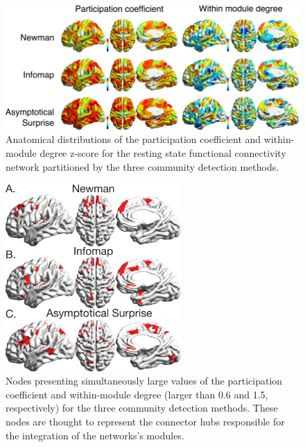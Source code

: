 \begin{figure}[!htb]
\centering
\includegraphics[width=1\textwidth]{images/pacopaperfigure8.pdf}
\caption{Anatomical distributions of the participation coefficient and within-module degree z-score for the resting state functional connectivity network partitioned by the three community detection methods.}
\label{fig:hubclassification}
\end{figure}
\begin{figure}[!htb]
\centering
\includegraphics[width=0.6\textwidth]{images/pacopaperfigure9.pdf}
\caption{Nodes presenting simultaneously large values of the participation coefficient and within-module degree (larger than 0.6 and 1.5, respectively) for the three community detection methods.
These nodes are thought to represent the connector hubs responsible for the integration of the networks's modules.
}
\label{fig:hubclassification_threshold}
\end{figure}

